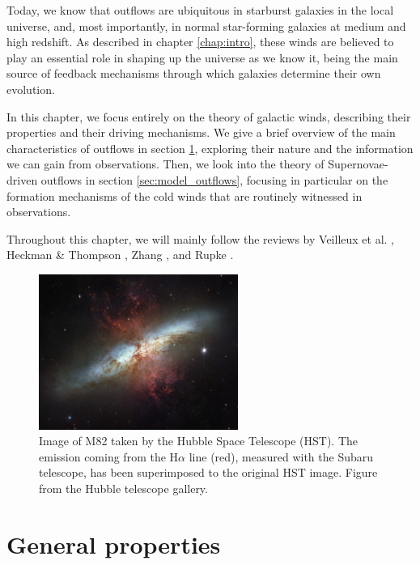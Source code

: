 Today, we know that outflows are ubiquitous in starburst galaxies in the local universe, and, most importantly, in normal star-forming galaxies at medium and high redshift. As described in chapter \ref{chap:intro}, these winds are believed to play an essential role in shaping up the universe as we know it, being the main source of feedback mechanisms through which galaxies determine their own evolution. 

In this chapter, we focus entirely on the theory of galactic winds, describing their properties and their driving mechanisms. We give a brief overview of the main characteristics of outflows in section \ref{sec:intro_outflows}, exploring their nature and the information we can gain from observations. Then, we look into the theory of Supernovae-driven outflows in section \ref{sec:model_outflows}, focusing in particular on the formation mechanisms of the cold winds that are routinely witnessed in observations. 

Throughout this chapter, we will mainly follow the reviews by Veilleux et al. \citep{Veilleux:2005ia, veilleux2020cool}, Heckman \& Thompson \citep{heckman2017galactic}, Zhang \citep{zhang2018review}, and Rupke \citep{rupke2018review}. 



\begin{figure}
    \centering
    \includegraphics[width=0.58\textwidth]{plots/m82.jpg}
    \caption{Image of M82 taken by the Hubble Space Telescope (HST). The emission coming from the H$\alpha$ line (red), measured with the Subaru telescope, has been superimposed to the original HST image. Figure from the Hubble telescope
    gallery. }
    \label{fig:m82}
\end{figure}


\section{General properties} \label{sec:intro_outflows}



